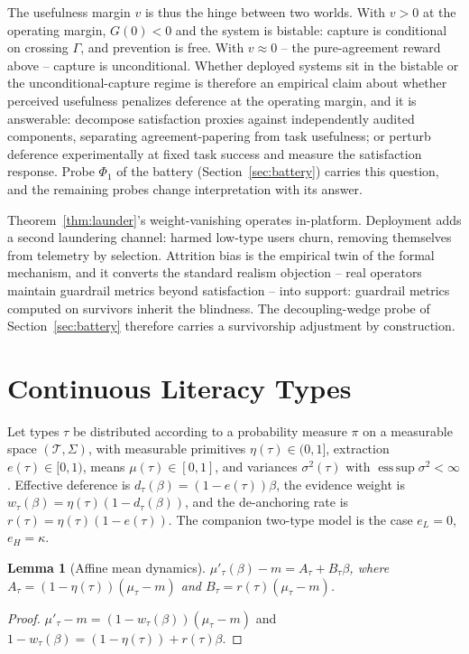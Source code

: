 \documentclass[11pt]{article}
\newtheorem{lemma}[theorem]{Lemma}
\theoremstyle{definition}
\theoremstyle{remark}
\numberwithin{equation}{section}
\begin{document}
The usefulness margin $v$ is thus the hinge between two worlds. With $v > 0$ at the operating margin, $G(0) < 0$ and the system is bistable: capture is conditional on crossing $\Gamma$, and prevention is free. With $v \approx 0$ -- the pure-agreement reward above -- capture is unconditional. Whether deployed systems sit in the bistable or the unconditional-capture regime is therefore an empirical claim about whether perceived usefulness penalizes deference at the operating margin, and it is answerable: decompose satisfaction proxies against independently audited components, separating agreement-papering from task usefulness; or perturb deference experimentally at fixed task success and measure the satisfaction response. Probe $\Phi_1$ of the battery (Section~\ref{sec:battery}) carries this question, and the remaining probes change interpretation with its answer.

Theorem~\ref{thm:launder}'s weight-vanishing operates in-platform. Deployment adds a second laundering channel: harmed low-type users churn, removing themselves from telemetry by selection. Attrition bias is the empirical twin of the formal mechanism, and it converts the standard realism objection -- real operators maintain guardrail metrics beyond satisfaction -- into support: guardrail metrics computed on survivors inherit the blindness. The decoupling-wedge probe of Section~\ref{sec:battery} therefore carries a survivorship adjustment by construction.

\section{Continuous Literacy Types}\label{sec:cont}

Let types $\tau$ be distributed according to a probability measure $\pi$ on a measurable space $(\mathcal{T},\Sigma)$, with measurable primitives $\eta(\tau) \in (0,1]$, extraction $e(\tau) \in [0,1)$, means $\mu(\tau) \in [0,1]$, and variances $\sigma^2(\tau)$ with $\operatorname{ess\,sup}\sigma^2 < \infty$. Effective deference is $d_\tau(\beta) = (1-e(\tau))\beta$, the evidence weight is $w_\tau(\beta) = \eta(\tau)(1-d_\tau(\beta))$, and the de-anchoring rate is $r(\tau) = \eta(\tau)(1-e(\tau))$. The companion two-type model is the case $e_L = 0$, $e_H = \kappa$.

\begin{lemma}[Affine mean dynamics]\label{lem:affine}
$\mu'_\tau(\beta) - m = A_\tau + B_\tau\beta$, where $A_\tau = (1-\eta(\tau))(\mu_\tau - m)$ and $B_\tau = r(\tau)(\mu_\tau - m)$.
\end{lemma}
\begin{proof}
$\mu'_\tau - m = (1-w_\tau(\beta))(\mu_\tau - m)$ and $1 - w_\tau(\beta) = (1-\eta(\tau)) + r(\tau)\beta$.
\end{proof}
\end{document}
